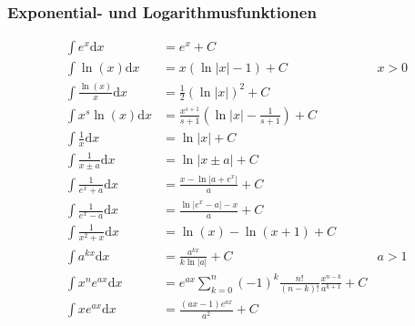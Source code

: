 \documentclass[8pt, a4paper, landscape, fleqn]{scrartcl}
\def\d{\text{d}}
\begin{document}
\begin{multicols*}{3}
				\subsubsection{Exponential- und Logarithmusfunktionen}
					\vspace{-7pt}
					\begin{align*}
					    \int e^x\text{d}x&=e^x + C\\
					    \int \ln(x)\text{d}x&=x\left(\ln\vert x \vert -1 \right)+C &x>0\\
					    \int \frac{\ln{(x)}}{x}\text{d}x&=\frac{1}{2}(\ln \vert x \vert)^2 +C\\
					    \int x^s\ln{(x)}\text{d}x&=\frac{x^{s+1}}{s+1}\left( \ln \vert x \vert-\frac{1}{s+1} \right) + C\\
					    \int \frac{1}{x}\text{d}x&=\ln\vert x \vert + C\\
					    \int \frac{1}{x\pm a}\text{d}x&=\ln \vert x\pm a \vert + C\\
					    \int \frac{1}{e^x+a}\text{d}x&=\frac{x-\ln \vert a+e^x \vert}{a} + C\\
					    \int \frac{1}{e^x-a}\text{d}x&=\frac{\ln \vert e^x-a \vert-x}{a} + C\\
					    \int \frac{1}{x^2+x}\text{d}x&=\ln(x)- \ln(x+1) + C\\
						\int a^{kx}\text{d}x&=\frac{a^{kx}}{k\ln \vert a \vert} +C &a>1\\
						\int x^ne^{ax}\text{d}x&=e^{ax}\sum_{k=0}^{n}(-1)^k \frac{n!}{(n-k)!} \frac{x^{n-k}}{a^{k+1}}+C\\
						\int xe^{ax} \d x &= \frac{(ax-1)e^{ax}}{a^2}+C
					\end{align*}

\end{multicols*}
\end{document}
